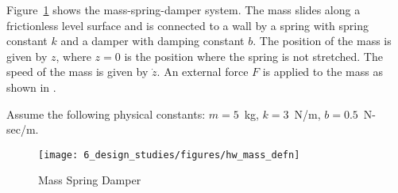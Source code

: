 Figure~\ref{fig:hw_mass_defn} shows the mass-spring-damper system.  The mass slides along a frictionless level surface and is connected to a wall by a spring with spring constant $k$ and a damper with damping constant $b$.   The position of the mass is given by $z$, where $z=0$ is the position where the spring is not stretched.  The speed of the mass is given by $\dot{z}$.  An external force $F$ is applied to the mass as shown in .

Assume the following physical constants: $m=5$~kg, $k=3$~N/m, $b=0.5$~N-sec/m.

\begin{figure}[hhhhtb]
  \centering
  \texttt{[image: 6\_design\_studies/figures/hw\_mass\_defn]}\\
  \caption{Mass Spring Damper}
  \label{fig:hw_mass_defn}
\end{figure}


